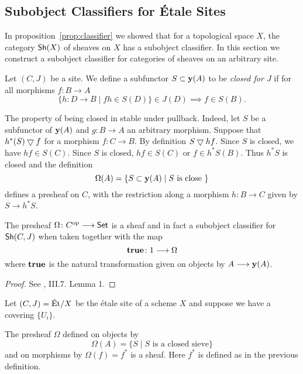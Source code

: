 \subsection{Subobject Classifiers for \'Etale Sites}
In proposition~\ref{prop:classifier} we showed that for a topological space $X$, the category $\operatorname{\mathsf{Sh}}(X)$ of sheaves on $X$ has a subobject classifier. In this section we construct a subobject classifier for categories of sheaves on an arbitrary site.

\begin{definition}
	Let $(C,J)$ be a site. We define a subfunctor $S \subset \mathbf{y}(A)$ to be \textit{closed for $J$} if for all morphisms $f \colon B \to A$
	\[
		\{h \colon D \to B \mid fh \in S(D) \} \in J(D) \implies f \in S(B).
	\]
\end{definition}

The property of being closed in stable under pullback. Indeed, let $S$ be a subfunctor of $\mathbf{y}(A)$ and $g \colon B \to A$ an arbitrary morphism. Suppose that $h^*(S) \bigtriangledown f$ for a morphism $f \colon C \to B$. By definition $S \bigtriangledown hf$. Since $S$ is closed, we have $hf \in S(C)$. Since $S$ is closed, $hf \in S(C)$ or $f \in h^*S(B)$. Thus $h^*S$ is closed and the definition \[\Omega(A) = \{S \subset \mathbf{y}(A) \mid S \text{ is close }\}\] defines a presheaf on $C$, with the restriction along a morphism $h \colon B \to C$ given by $S \to h^*S$.

\begin{proposition}
	The presheaf $\Omega \colon C^{\text{op}} \longrightarrow \mathsf{Set}$ is a sheaf and in fact a subobject classifier for $\operatorname{\mathsf{Sh}}(C,J)$ when taken together with the map
	\[\mathbf{true} \colon 1 \longrightarrow \Omega \] where $\mathbf{true}$ is the natural transformation given on objects by $A \longrightarrow \mathbf{y}(A)$.
\end{proposition}

\begin{proof}
	See \cite{SIGL}, III.7. Lemma 1.
\end{proof}

\begin{example}
	Let $(C,J) = \text{\'Et}/X$ be the \'etale site of a scheme $X$ and suppose we have a covering $\{U_i\}$.
\end{example}

\begin{lemma}
	The presheaf $\Omega$ defined on objects by
	\[
		\Omega(A) = \{S \mid S \text{ is a closed sieve}\}
	\]
	and on morphisms by $\Omega(f) = f^*$ is a sheaf. Here $f^*$ is defined as in the previous definition.
\end{lemma}
